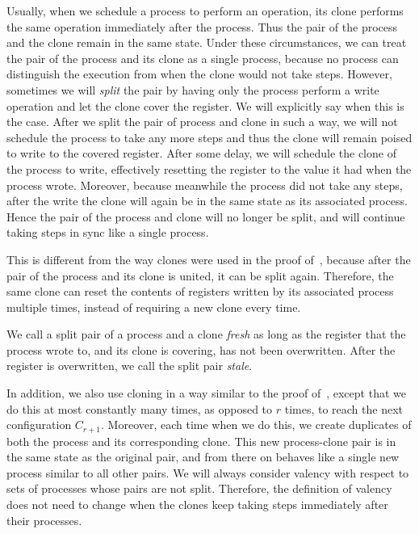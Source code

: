 Usually, when we schedule a process to perform an operation,
  its clone performs the same operation immediately after the process.  
  Thus the pair of the process and the clone remain in the same state.
Under these circumstances, we can treat the pair of the process and its clone as a single process,
  because no process can distinguish the execution from when the clone would not take steps.
However, sometimes we will \emph{split} the pair by having only the process perform a write operation 
  and let the clone cover the register.
We will explicitly say when this is the case.
After we split the pair of process and clone in such a way, 
  we will not schedule the process to take any more steps and thus the clone will remain poised to write to the covered register.
After some delay, we will schedule the clone of the process to write, 
  effectively resetting the register to the value it had when the process wrote. 
Moreover, because meanwhile the process did not take any steps,
  after the write the clone will again be in the same state as its associated process.
Hence the pair of the process and clone will no longer be split, 
  and will continue taking steps in sync like a single process.

This is different from the way clones were used in the proof of~,
  because after the pair of the process and its clone is united, it can be split again.
Therefore, the same clone can reset the contents of registers written by its associated process multiple times, 
instead of requiring a new clone every time.

We call a split pair of a process and a clone \emph{fresh} as long as the register that 
  the process wrote to, and its clone is covering, has not been overwritten.
After the register is overwritten, we call the split pair \emph{stale}.

In addition, we also use cloning in a way similar to the proof of~, 
  except that we do this at most constantly many times, as opposed to $r$ times, to reach the next configuration $C_{r+1}$.
Moreover, each time when we do this, we create duplicates of both the process and its corresponding clone.
This new process-clone pair is in the same state as the original pair, 
  and from there on behaves like a single new process similar to all other pairs.
We will always consider valency with respect to sets of processes whose pairs are not split. 
Therefore, the definition of valency does not need to change 
  when the clones keep taking steps immediately after their processes.

